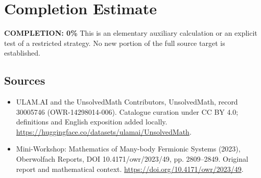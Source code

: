 \documentclass[11pt]{article}
\begin{document}
\section{Completion Estimate}
\noindent\textbf{COMPLETION: 0\%}
This is an elementary auxiliary calculation or an explicit test of a restricted strategy. No new portion of the full source target is established.

\subsection{Sources}
\begin{itemize}
\item[\hypertarget{source:30005746:1}{S1}] ULAM.AI and the UnsolvedMath Contributors, UnsolvedMath, record 30005746 (OWR-14298014-006). Catalogue curation under CC BY 4.0; definitions and English exposition added locally.
\url{https://huggingface.co/datasets/ulamai/UnsolvedMath}.
\item[\hypertarget{source:30005746:2}{S2}] Mini-Workshop: Mathematics of Many-body Fermionic Systems (2023), Oberwolfach Reports, DOI 10.4171/owr/2023/49, pp. 2809--2849. Original report and mathematical context.
\url{https://doi.org/10.4171/owr/2023/49}.
\end{itemize}
\label{end:30005746}
\end{document}
